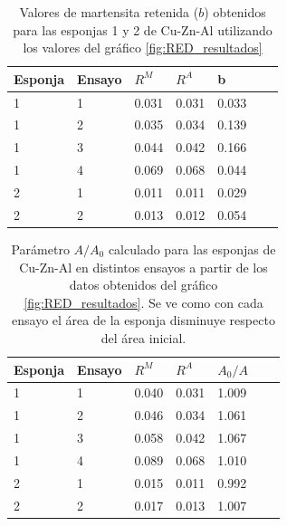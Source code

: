 \documentclass[a4paper,12pt,fleqn,twoside,openany]{book}
\begin{document}
\begin{table} 
\begin{center} 
\begin{tabular}{@{}lllllll@{}} \toprule
Esponja &Ensayo   &    $R^M$    &  ${R^A}$ &  b \\ \midrule
1 & 1       &  0.031  & 0.031   & 0.033  \\
1 & 2       &  0.035  & 0.034  &  0.139  \\
1 & 3       &  0.044  & 0.042  &  0.166  \\
1 & 4      &  0.069 &	0.068 &	0.044 \\
2 & 1      &  0.011 &	0.011 & 0.029 \\
2 & 2      &  0.013 &	0.012 & 0.054\\
 \bottomrule

 \end{tabular}
\caption{Valores de martensita retenida ($b$) obtenidos para las esponjas 1 y 2 de Cu-Zn-Al utilizando los valores del gráfico \ref{fig:RED_resultados} }
\label{tab:b}
\end{center}
\end{table}
\begin{table} 
\begin{center} 
\begin{tabular}{@{}lllllll@{}} \toprule
Esponja & Ensayo   &    $R^M$    &  $R^A$ &  $A_0/A$ \\ \midrule
1   & 1       &  0.040  & 0.031 & 1.009  \\
1   & 2       &  0.046  & 0.034 &  1.061  \\
1   & 3       &  0.058  & 0.042 &  1.067  \\
1   & 4     &  0.089  & 0.068 &  1.010 \\
2   & 1     &  0.015  & 0.011 &  0.992  \\
2   & 2    &  0.017  & 0.013 &  1.007   \\
\bottomrule
\end{tabular}
\caption{Parámetro $A/A_0$ calculado para las esponjas de Cu-Zn-Al en distintos ensayos a partir de los datos obtenidos del gráfico \ref{fig:RED_resultados}. Se ve como con cada ensayo el área de la esponja disminuye respecto del área inicial.}
\label{tab:A0Arotura}
\end{center}
\end{table}
\end{document}
